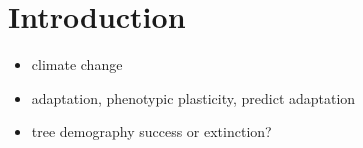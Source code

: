 \section*{Introduction}

\begin{itemize}
	\item climate change
	\item adaptation, phenotypic plasticity, predict adaptation
	\item tree demography success or extinction?
\end{itemize}